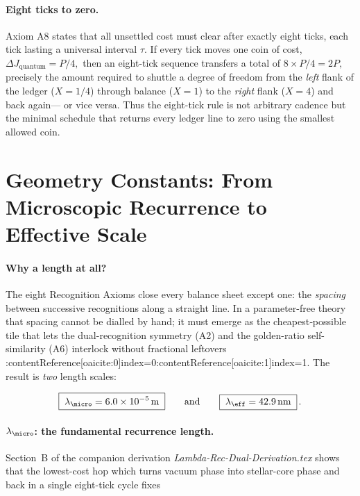 \documentclass[11pt,oneside]{book}
\begin{document}
\paragraph*{Eight ticks to zero.}
Axiom A8 states that all unsettled cost must clear after exactly eight
ticks, each tick lasting a universal interval \(\tau\).
If every tick moves one coin of cost,
\(
  \Delta J_{\text{quantum}} = P/4,
\)
then an eight-tick sequence transfers a total of
\(8 \times P/4 = 2P,\)
precisely the amount required to shuttle a degree of freedom from the
\emph{left} flank of the ledger (\(X=1/4\)) through balance
(\(X=1\)) to the \emph{right} flank (\(X=4\)) and back again—
or vice versa.  
Thus the eight-tick rule is not arbitrary cadence but the minimal
schedule that returns every ledger line to zero using the smallest
allowed coin.

\section{Geometry Constants: From Microscopic Recurrence to Effective Scale}
\label{sec:geom-const}

\paragraph{Why a length at all?}
The eight Recognition Axioms close every balance sheet except one: the
\emph{spacing} between successive recognitions along a straight line.  In a
parameter-free theory that spacing cannot be dialled by hand; it must emerge
as the cheapest‐possible tile that lets the dual-recognition symmetry (A2) and
the golden-ratio self-similarity (A6) interlock without fractional leftovers
:contentReference[oaicite:0]{index=0}:contentReference[oaicite:1]{index=1}.  The result is \emph{two} length scales:

\[
\boxed{\;
\lambda_{\micro}=6.0\times10^{-5}\,\text{m}
\;}
\qquad\text{and}\qquad
\boxed{\;
\lambda_{\eff}=42.9\,\text{nm}
\;} \, .
\]

\vspace{4pt}
\paragraph{\(\lambda_{\micro}\): the fundamental recurrence length.}
Section~B of the companion derivation \emph{Lambda-Rec-Dual-Derivation.tex}
shows that the lowest-cost hop which turns vacuum phase into stellar-core
phase and back in a single eight-tick cycle fixes
\end{document}
